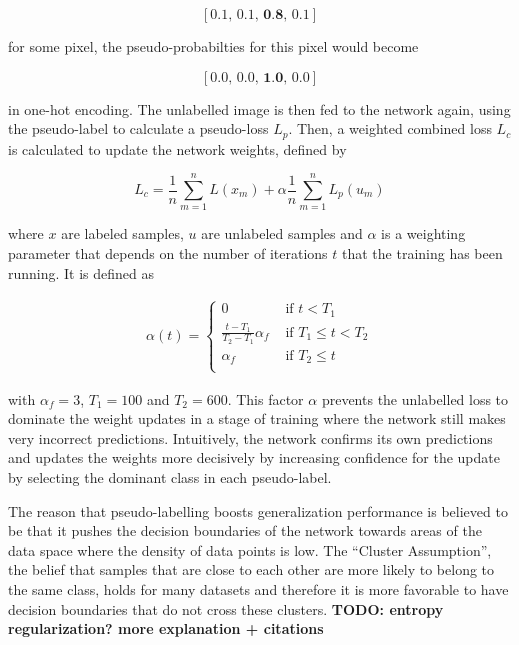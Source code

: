 \[ [0.1,\, 0.1,\, \textbf{0.8},\, 0.1] \]

\noindent for some pixel, the pseudo-probabilties for this pixel would become

\[ [0.0,\, 0.0,\, \textbf{1.0},\, 0.0] \]

\noindent in one-hot encoding. The unlabelled image is then fed to the network again, using the pseudo-label to calculate a pseudo-loss $L_p$. Then, a weighted combined loss $L_c$ is calculated to update the network weights, defined by

\[ L_c = \frac{1}{n} \sum \limits_{m=1}^{n} L(x_m) + \alpha \frac{1}{n} \sum \limits_{m=1}^{n} L_p(u_m)  \]

\noindent where $x$ are labeled samples, $u$ are unlabeled samples and $\alpha$ is a weighting parameter that depends on the number of iterations $t$ that the training has been running. It is defined as

\begin {align}
\alpha(t) = \begin{cases} 0 &\text{ if } t < T_1 \\
				\frac{t - T_1}{T_2 - T_1} \alpha_f &\text{ if } T_1 \leq t < T_2 \\
				\alpha_f &\text { if } T_2 \leq t \\
	        \end{cases}
\end {align}

\noindent with $\alpha_f = 3$, $T_1 = 100$ and $T_2 = 600$. This factor $\alpha$ prevents the unlabelled loss to dominate the weight updates in a stage of training where the network still makes very incorrect predictions. Intuitively, the network confirms its own predictions and updates the weights more decisively by increasing confidence for the update by selecting the dominant class in each pseudo-label.

The reason that pseudo-labelling boosts generalization performance is believed to be that it pushes the decision boundaries of the network towards areas of the data space where the density of data points is low. The ``Cluster Assumption'', the belief that samples that are close to each other are more likely to belong to the same class, holds for many datasets and therefore it is more favorable to have decision boundaries that do not cross these clusters. \textbf{TODO: entropy regularization? more explanation + citations}